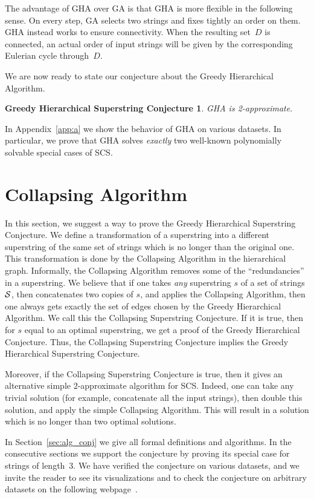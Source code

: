 \documentclass[11pt]{article}
\begin{document}
The advantage of GHA over GA is that GHA is more flexible in the following sense. On every step, GA selects two strings and fixes tightly an order on them. GHA instead works to ensure connectivity. When the resulting set~$D$ is connected, an actual order of input strings will be given by the corresponding Eulerian cycle through~$D$.

We are now ready to state our conjecture about the Greedy Hierarchical Algorithm.
\newtheorem*{ghcc}{Greedy Hierarchical Superstring Conjecture}
\begin{ghcc}
GHA is 2-approximate.
\end{ghcc}
In Appendix~\ref{app:a} we show the behavior of GHA on various datasets. In particular, we prove that GHA solves \emph{exactly} two well-known polynomially solvable special cases of SCS. 

\section{Collapsing Algorithm}
In this section, we suggest a way to prove the Greedy Hierarchical Superstring Conjecture. We define a transformation of a superstring into a different superstring of the same set of strings which is no longer than the original one. This transformation is done by the Collapsing Algorithm in the hierarchical graph. Informally, the Collapsing Algorithm removes some of the ``redundancies'' in a superstring. We believe that if one takes \emph{any} superstring $s$ of a set of strings ${\cal S}$, then concatenates two copies of $s$, and applies the Collapsing Algorithm, then one always gets exactly the set of edges chosen by the Greedy Hierarchical Algorithm. We call this the Collapsing Superstring Conjecture. If it is true, then for $s$ equal to an optimal superstring, we get a proof of the Greedy Hierarchical Conjecture. Thus, the Collapsing Superstring Conjecture implies the Greedy Hierarchical Superstring Conjecture. 

Moreover, if the Collapsing Superstring Conjecture is true, then it gives an alternative simple $2$-approximate algorithm for SCS. Indeed, one can take any trivial solution (for example, concatenate all the input strings), then double this solution, and apply the simple Collapsing Algorithm. This will result in a solution which is no longer than two optimal solutions.

In Section~\ref{sec:alg_conj} we give all formal definitions and algorithms. In the consecutive sections we support the conjecture by proving its special case for strings of length~3. We have verified the conjecture on various datasets, and we invite the reader to see its visualizations and to check the conjecture on arbitrary datasets on the following webpage~\cite{webpage}.
\end{document}
